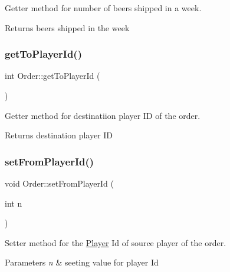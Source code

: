 Getter method for number of beers shipped in a week. 

\begin{DoxyReturn}{Returns}
beers shipped in the week 
\end{DoxyReturn}
\mbox{\label{class_order_a212e8294656ab9582dbca89de2e1e4c9}} 
\subsubsection{\texorpdfstring{get\+To\+Player\+Id()}{getToPlayerId()}}
{\footnotesize\ttfamily int Order\+::get\+To\+Player\+Id (\begin{DoxyParamCaption}{ }\end{DoxyParamCaption})}



Getter method for destinatiion player ID of the order. 

\begin{DoxyReturn}{Returns}
destination player ID 
\end{DoxyReturn}
\mbox{\label{class_order_a8a41cdea30959709f9c9dbdadd4f62f0}} 
\subsubsection{\texorpdfstring{set\+From\+Player\+Id()}{setFromPlayerId()}}
{\footnotesize\ttfamily void Order\+::set\+From\+Player\+Id (\begin{DoxyParamCaption}\item[{int}]{n }\end{DoxyParamCaption})}



Setter method for the \hyperlink{class_player}{Player} Id of source player of the order. 


\begin{DoxyParams}{Parameters}
{\em n} & seeting value for player Id \\
\hline
\end{DoxyParams}
\mbox{\label{class_order_a15811f6d8f69a15cc5ca2558328310d6}} 

